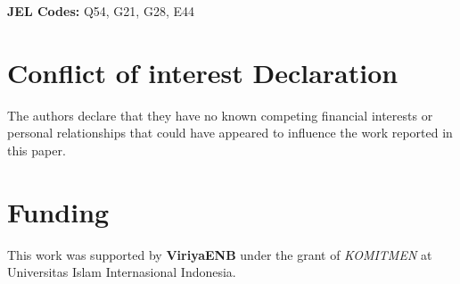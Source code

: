 \documentclass[12pt, a4paper]{article}
\begin{document}
\medskip
\noindent\textbf{JEL Codes:} Q54, G21, G28, E44

\newpage












\section*{Conflict of interest Declaration}
\noindent
The authors declare that they have no known competing financial interests or personal relationships that could have appeared to influence the work reported in this paper.

\section*{Funding}
\noindent
This work was supported by \textbf{ViriyaENB} under the grant of \textit{KOMITMEN} at Universitas Islam Internasional Indonesia.




\appendix




% 
\end{document}
